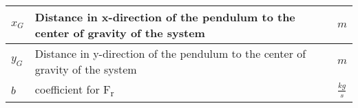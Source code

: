 \begin{table}[H]
\begin{tabular}{|l|l|l|}
$x_G$           &Distance in x-direction of the pendulum to the center of gravity of the system         &$m$                        \\ \hline
$y_G$           &Distance in y-direction of the pendulum to the center of gravity of the system         &$m$                        \\ \hline
$b$            &coefficient for F\textsubscript{r}                                                      & $\frac{kg}{s}$                      \\ \hline
\end{tabular}
\end{table}